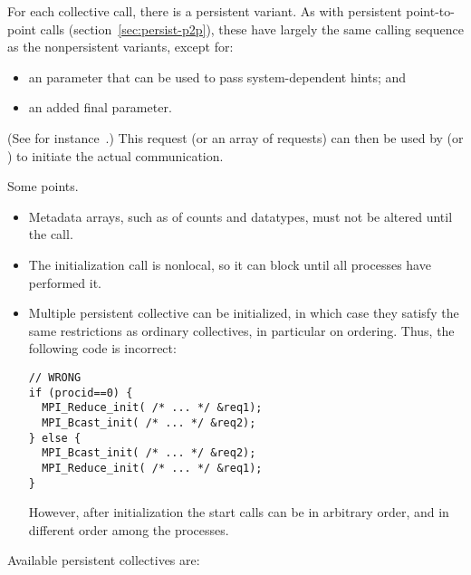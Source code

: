 \begin{mpifour}
For each collective call, there is a persistent variant.
As with persistent point-to-point calls (section~\ref{sec:persist-p2p}),
these have largely the same calling sequence as the nonpersistent variants,
except for:
\begin{itemize}
\item an  parameter that can be used to pass
  system-dependent hints; and
\item
  an added final  parameter.
\end{itemize}
(See for instance~.)
This request (or an array of requests) can then be used by
 (or )
to initiate the actual communication.


Some points.
\begin{itemize}
\item
  Metadata arrays, such as of counts and datatypes,
  must not be altered until the  call.
\item The initialization call is nonlocal, so it can block until all
  processes have performed it.
\item Multiple persistent collective can be initialized, in which case
  they satisfy the same restrictions as ordinary collectives, in particular
  on ordering. Thus, the following code is incorrect:
\begin{lstlisting}
// WRONG
if (procid==0) {
  MPI_Reduce_init( /* ... */ &req1);
  MPI_Bcast_init( /* ... */ &req2);
} else {
  MPI_Bcast_init( /* ... */ &req2);
  MPI_Reduce_init( /* ... */ &req1);
}
\end{lstlisting}
However, after initialization the start calls can be in arbitrary order,
and in different order among the processes.
\end{itemize}

\begin{raggedlist} %
  Available persistent collectives are:
\end{raggedlist} %

\end{mpifour}

